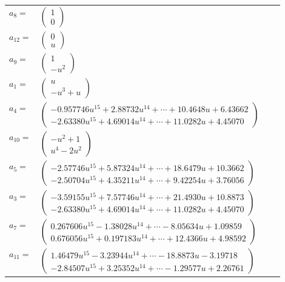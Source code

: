 \documentclass[1p]{elsarticle_modified}
\theoremstyle{definition}
\begin{document}
\begin{tabular}{m{7pt} m{180pt} m{7pt} m{180pt} }
\flushright $a_{8}=$&$\begin{pmatrix}1\\0\end{pmatrix}$ \\
\flushright $a_{12}=$&$\begin{pmatrix}0\\u\end{pmatrix}$ \\
\flushright $a_{9}=$&$\begin{pmatrix}1\\- u^2\end{pmatrix}$ \\
\flushright $a_{1}=$&$\begin{pmatrix}u\\- u^3+u\end{pmatrix}$ \\
\flushright $a_{4}=$&$\begin{pmatrix}-0.957746 u^{15}+2.88732 u^{14}+\cdots+10.4648 u+6.43662\\-2.63380 u^{15}+4.69014 u^{14}+\cdots+11.0282 u+4.45070\end{pmatrix}$ \\
\flushright $a_{10}=$&$\begin{pmatrix}- u^2+1\\u^4-2 u^2\end{pmatrix}$ \\
\flushright $a_{5}=$&$\begin{pmatrix}-2.57746 u^{15}+5.87324 u^{14}+\cdots+18.6479 u+10.3662\\-2.50704 u^{15}+4.35211 u^{14}+\cdots+9.42254 u+3.76056\end{pmatrix}$ \\
\flushright $a_{3}=$&$\begin{pmatrix}-3.59155 u^{15}+7.57746 u^{14}+\cdots+21.4930 u+10.8873\\-2.63380 u^{15}+4.69014 u^{14}+\cdots+11.0282 u+4.45070\end{pmatrix}$ \\
\flushright $a_{7}=$&$\begin{pmatrix}0.267606 u^{15}-1.38028 u^{14}+\cdots-8.05634 u+1.09859\\0.676056 u^{15}+0.197183 u^{14}+\cdots+12.4366 u+4.98592\end{pmatrix}$ \\
\flushright $a_{11}=$&$\begin{pmatrix}1.46479 u^{15}-3.23944 u^{14}+\cdots-18.8873 u-3.19718\\-2.84507 u^{15}+3.25352 u^{14}+\cdots-1.29577 u+2.26761\end{pmatrix}$ \\

\end{tabular}
\end{document}
